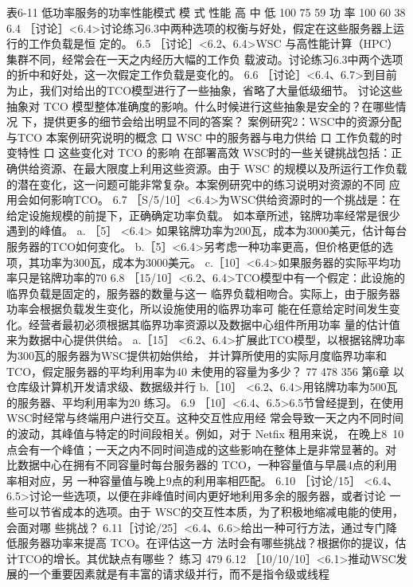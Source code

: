 表6-11 低功率服务的功率性能模式
模
式
性能
高
中
低
100%
75%
59%
功
率
100%
60%
38%
6.4
［讨论］<6.4>讨论练习6.3中两种选项的权衡与好处，假定在这些服务器上运行的工作负载是恒
定的。
6.5
［讨论］<6.2、6.4>WSC 与高性能计算（HPC）集群不同，经常会在一天之内经历大幅的工作负
载波动。讨论练习6.3中两个选项的折中和好处，这一次假定工作负载是变化的。
6.6
［讨论］<6.4、6.7>到目前为止，我们对给出的TCO模型进行了一些抽象，省略了大量低级细节。
讨论这些抽象对 TCO 模型整体准确度的影响。什么时候进行这些抽象是安全的？在哪些情况
下，提供更多的细节会给出明显不同的答案？
案例研究2：WSC中的资源分配与TCO
本案例研究说明的概念
口 WSC 中的服务器与电力供给
口 工作负载的时变特性
口 这些变化对 TCO 的影响
在部署高效 WSC时的一些关键挑战包括：正确供给资源、在最大限度上利用这些资源。由于 WSC
的规模以及所运行工作负载的潜在变化，这一问题可能非常复杂。本案例研究中的练习说明对资源的不同
应用会如何影响TCO。
6.7
［S/5/10］<6.4>为WSC供给资源时的一个挑战是：在给定设施规模的前提下，正确确定功率负载。
如本章所述，铭牌功率经常是很少遇到的峰值。
a. ［5］ <6.4> 如果铭牌功率为200瓦，成本为3000美元，估计每台服务器的TCO如何变化。
b.［5］<6.4>另考虑一种功率更高，但价格更低的选项，其功率为300瓦，成本为3000美元。
c.［10］<6.4>如果服务器的实际平均功率只是铭牌功率的70%
6.8
［15/10］<6.2、6.4>TCO模型中有一个假定：此设施的临界负载是固定的，服务器的数量与这一
临界负载相吻合。实际上，由于服务器功率会根据负载发生变化，所以设施使用的临界功率可
能在任意给定时间发生变化。经营者最初必须根据其临界功率资源以及数据中心组件所用功率
量的估计值来为数据中心提供供给。
a.［15］ <6.2、6.4>扩展此TCO模型，以根据铭牌功率为300瓦的服务器为WSC提供初始供给，
并计算所使用的实际月度临界功率和TCO，假定服务器的平均利用率为40%
未使用的容量为多少？
77
478
356
第6章 以仓库级计算机开发请求级、数据级并行
b.［10］ <6.2、6.4>用铭牌功率为500瓦的服务器、平均利用率为20%
练习。
6.9 ［10］<6.4、6.5>6.5节曾经提到，在使用WSC时经常与终端用户进行交互。这种交互性应用经
常会导致一天之内不同时间的波动，其峰值与特定的时间段相关。例如，对于 Netfix 租用来说，
在晚上8~10点会有一个峰值；一天之内不同时间造成的这些影响在整体上是非常显著的。对
比数据中心在拥有不同容量时每台服务器的 TCO，一种容量值与早晨4点的利用率相对应，另
一种容量值与晚上9点的利用率相匹配。
6.10
［讨论/15］ <6.4、6.5>讨论一些选项，以便在非峰值时间内更好地利用多余的服务器，或者讨论
一些可以节省成本的选项。由于 WSC的交互性本质，为了积极地缩减电能的使用，会面对哪
些挑战？
6.11［讨论/25］<6.4、6.6>给出一种可行方法，通过专门降低服务器功率来提高 TCO。在评估这一方
法时会有哪些挑战？根据你的提议，估计TCO的增长。其优缺点有哪些？
练习
479
6.12 ［10/10/10］<6.1>推动WSC发展的一个重要因素就是有丰富的请求级并行，而不是指令级或线程
